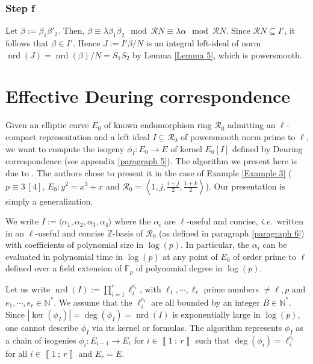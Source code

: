 \documentclass[a4paper,10pt]{report}
\theoremstyle{definition}
\theoremstyle{plain}
\theoremstyle{definition}
\newcommand{\ie}{\emph{i.e.}\ }
\newcommand{\N}{\mathbb{N}}
\newcommand{\Z}{\mathbb{Z}}
\newcommand{\F}{\mathbb{F}}
\newcommand{\m}[1]{\mathcal{#1}}
\renewcommand{\i}[2]{\left\llbracket #1~;~#2\right\rrbracket}
\renewcommand{\(}{\left(}
\renewcommand{\)}{\right)}
\DeclareMathOperator{\nrd}{nrd}
\begin{document}
\subsubsection{Step f}

Let $\beta:=\beta_1\beta'_2$. Then, $\beta\equiv \lambda\beta_1\beta_2 \mod \m{R}N\equiv \lambda\alpha \mod \m{R}N$. Since $\m{R}N\subseteq I'$, it follows that $\beta\in I'$. Hence $J:=I'\overline{\beta}/N$ is an integral left-ideal of norm $\nrd(J)=\nrd(\beta)/N=S_1S_2$ by Lemma \ref{Lemma 5}, which is powersmooth. 

\section{Effective Deuring correspondence}\label{paragraph 4}

Given an elliptic curve $E_0$ of known endomorphism ring $\m{R}_0$ admitting an $\ell$-compact representation and a left ideal $I\subseteq \m{R}_0$ of powersmooth norm prime to $\ell$, we want to compute the isogeny $\phi_I : E_0\longrightarrow E$ of kernel $E_0[I]$ defined by Deuring correspondence (see appendix \ref{paragraph 5}). The algorithm we present here is due to \cite{Galbraith2016}. The authors chose to present it in the case of Example \ref{Example 3} ($p\equiv 3 \ [4]$, $E_0:y^2=x^3+x$ and $\m{R}_0=\left \langle 1, j,\frac{i+j}{2},\frac{1+k}{2}\right\rangle$). Our presentation is simply a generalization.

We write $I:=\langle\alpha_1,\alpha_2,\alpha_3,\alpha_4\rangle$ where the $\alpha_i$ are $\ell$-useful and concise, \ie written in an $\ell$-useful and concise $\Z$-basis of $\m{R}_0$ (as defined in paragraph \ref{paragraph 6}) with coefficients of polynomial size in $\log(p)$.  In particular, the $\alpha_i$ can be evaluated in polynomial time in $\log(p)$ at any point of $E_0$ of order prime to $\ell$ defined over a field extension of $\F_p$ of polynomial degree in $\log(p)$.  

Let us write $\nrd(I):=\prod_{i=1}^r \ell_i^{e_i}$, with $\ell_1, \cdots,\ell_r$ prime numbers $\neq \ell, p$ and $e_1,\cdots, e_r\in\N^*$. We assume that the $\ell_i^{e_i}$ are all bounded by an integer $B\in\N^*$.  Since $|\ker(\phi_I)|=\deg(\phi_I)=\nrd(I)$ is exponentially large in $\log(p)$, one cannot describe $\phi_I$ via its kernel or formulas. The algorithm represents $\phi_I$ as a chain of isogenies $\phi_i : E_{i-1}\longrightarrow E_{i}$ for $i\in\i{1}{r}$ such that $\deg(\phi_i)=\ell_i^{e_i}$ for all $i\in\i{1}{r}$ and $E_r=E$. 
\end{document}
